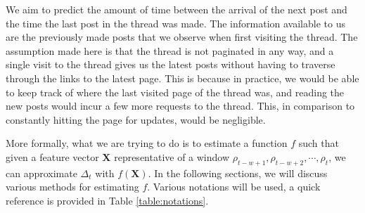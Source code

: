\newcommand{\vocab}{\mathbf{v}}
\newcommand{\dtvec}{\mathbf{t}_\Delta}
\newcommand{\ctxvec}{\mathbf{t}_\text{ctx}}
\newcommand{\dt}{\Delta_t}
\newcommand{\prerror}{Pr_{error}}
\newcommand{\weights}{\mathbf{w}}
\newcommand{\X}{\mathbf{X}}
\newcommand{\post}{\rho}
\renewcommand{\t}{t}
\newcommand{\w}{w}
We aim to predict the amount of time between the arrival of the next post and 
the time the last post in the thread was made. The information available to us 
are the previously made posts that we observe when first visiting the thread.  
The assumption made here is that the thread is not paginated in any way, and a 
single visit to the thread gives us the latest posts without having to traverse 
through the links to the latest page. This is because in practice, we would be 
able to keep track of where the last visited page of the thread was, and reading 
the new posts would incur a few more requests to the thread. This, in comparison 
to constantly hitting the page for updates, would be negligible.

More formally, what we are trying to do is to estimate a function $f$ such that 
given a feature vector $\X$ representative of a window $\post_{t - w + 
1},\post_{t - w + 2},\cdots ,\post_t$, we can approximate $\dt$ with $f(\X)$. In 
the following sections, we will discuss various methods for estimating $f$.  
Various notations will be used, a quick reference is provided in Table 
\ref{table:notations}.

